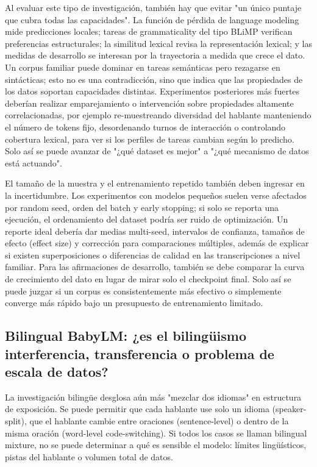 \documentclass[a4paper]{article}
\begin{document}
Al evaluar este tipo de investigación, también hay que evitar "un único puntaje que cubra todas las capacidades". La función de pérdida de language modeling mide predicciones locales; tareas de grammaticality del tipo BLiMP verifican preferencias estructurales; la similitud lexical revisa la representación lexical; y las medidas de desarrollo se interesan por la trayectoria a medida que crece el dato. Un corpus familiar puede dominar en tareas semánticas pero rezagarse en sintácticas; esto no es una contradicción, sino que indica que las propiedades de los datos soportan capacidades distintas. Experimentos posteriores más fuertes deberían realizar emparejamiento o intervención sobre propiedades altamente correlacionadas, por ejemplo re-muestreando diversidad del hablante manteniendo el número de tokens fijo, desordenando turnos de interacción o controlando cobertura lexical, para ver si los perfiles de tareas cambian según lo predicho. Solo así se puede avanzar de "¿qué dataset es mejor" a "¿qué mecanismo de datos está actuando".

El tamaño de la muestra y el entrenamiento repetido también deben ingresar en la incertidumbre. Los experimentos con modelos pequeños suelen verse afectados por random seed, orden del batch y early stopping; si solo se reporta una ejecución, el ordenamiento del dataset podría ser ruido de optimización. Un reporte ideal debería dar medias multi-seed, intervalos de confianza, tamaños de efecto (effect size) y corrección para comparaciones múltiples, además de explicar si existen superposiciones o diferencias de calidad en las transcripciones a nivel familiar. Para las afirmaciones de desarrollo, también se debe comparar la curva de crecimiento del dato en lugar de mirar solo el checkpoint final. Solo así se puede juzgar si un corpus es consistentemente más efectivo o simplemente converge más rápido bajo un presupuesto de entrenamiento limitado.

\subsection{Bilingual BabyLM: ¿es el bilingüismo interferencia, transferencia o problema de escala de datos?}

La investigación bilingüe desglosa aún más "mezclar dos idiomas" en estructura de exposición. Se puede permitir que cada hablante use solo un idioma (speaker-split), que el hablante cambie entre oraciones (sentence-level) o dentro de la misma oración (word-level code-switching). Si todos los casos se llaman bilingual mixture, no se puede determinar a qué es sensible el modelo: límites lingüísticos, pistas del hablante o volumen total de datos.
\end{document}
